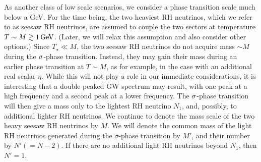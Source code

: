 \documentclass[a4paper,11pt]{article}
\begin{document}
As another class of low scale scenarios, we consider a phase transition scale much below a  GeV. 
For the time being, the two heaviest RH neutrinos, which we refer to as seesaw RH neutrinos,  
are assumed to couple the two sectors at temperature  $T \sim M \gtrsim 1\,{\rm GeV}$. (Later, we will 
relax this assumption and also consider other options.) Since $T_\star \ll M$, the two seesaw RH neutrinos  do not acquire  mass 
$\sim M$ during the $\sigma$-phase transition. Instead, they may gain their mass during an earlier phase transition at $T \sim M$,
as for example, in the case with an additional real scalar $\eta$.  While this will not play a role in our immediate considerations, it is interesting that a double peaked GW spectrum may result, with one peak at a high frequency and a second peak at a lower frequency. 
The $\sigma$-phase transition  will then give a mass only to the lightest  RH neutrino $N_1$, and, possibly, to additional lighter RH neutrinos. 
 We continue to denote the mass scale of the two heavy seesaw RH neutrinos by $M$. We will denote the 
 common mass of the light RH neutrinos generated during the $\sigma$-phase transition by $M'$,   and their number by $N' (=N-2)$. If there are no additional light RH neutrinos beyond $N_1$, then $N' = 1$.  
 
\end{document}
